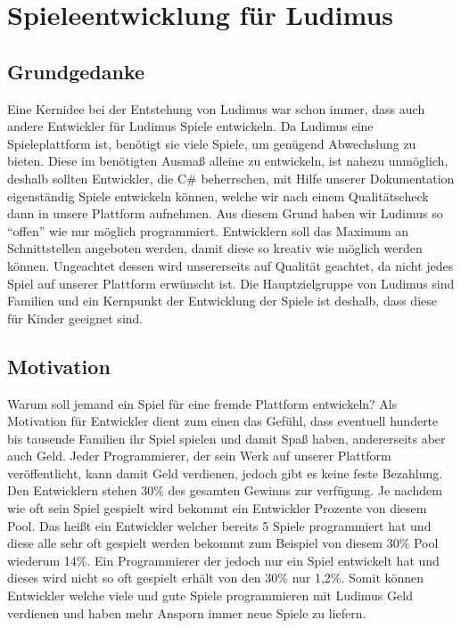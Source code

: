 \section{Spieleentwicklung für Ludimus}
\subsection{Grundgedanke}
Eine Kernidee bei der Entstehung von Ludimus war schon immer, dass auch andere Entwickler für Ludimus Spiele entwickeln. Da Ludimus eine Spieleplattform ist, benötigt sie viele Spiele, um genügend Abwechslung zu bieten. Diese im benötigten Ausmaß alleine zu entwickeln, ist nahezu unmöglich, deshalb sollten Entwickler, die C\# beherrschen, mit Hilfe unserer Dokumentation eigenständig Spiele entwickeln können, welche wir nach einem Qualitätscheck dann in unsere Plattform aufnehmen.
Aus diesem Grund haben wir Ludimus so “offen” wie nur möglich programmiert. Entwicklern soll das Maximum an Schnittstellen angeboten werden, damit diese so kreativ wie möglich werden können. Ungeachtet dessen wird unsererseits auf Qualität geachtet, da nicht jedes Spiel auf unserer Plattform erwünscht ist. Die Hauptzielgruppe von Ludimus sind Familien und ein Kernpunkt der Entwicklung der Spiele ist deshalb, dass diese für Kinder geeignet sind.
\subsection{Motivation}
Warum soll jemand ein Spiel für eine fremde Plattform entwickeln? Als Motivation für Entwickler dient zum einen das Gefühl, dass eventuell hunderte bis tausende Familien ihr Spiel spielen und damit Spaß haben, andererseits aber auch Geld. Jeder Programmierer, der sein Werk auf unserer Plattform veröffentlicht, kann damit Geld verdienen, jedoch gibt es keine feste Bezahlung. Den Entwicklern stehen 30\% des gesamten Gewinns zur verfügung. Je nachdem wie oft sein Spiel gespielt wird bekommt ein Entwickler Prozente von diesem Pool. Das heißt ein Entwickler welcher bereits 5 Spiele programmiert hat und diese alle sehr oft gespielt werden bekommt zum Beispiel von diesem 30\% Pool wiederum 14\%. Ein Programmierer der jedoch nur ein Spiel entwickelt hat und dieses wird nicht so oft gespielt erhält von den 30\% nur 1,2\%. Somit können Entwickler welche viele und gute Spiele programmieren mit Ludimus Geld verdienen und haben mehr Ansporn immer neue Spiele zu liefern. 
